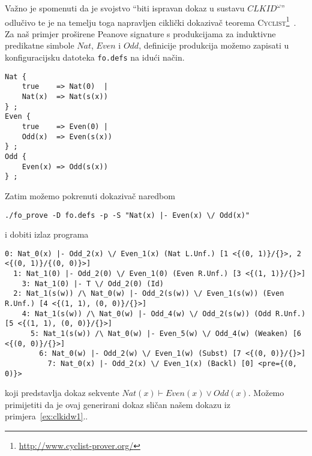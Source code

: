 Važno je spomenuti da je svojstvo \enquote{biti ispravan dokaz u sustavu \(\mathit{CLKID}^{\omega}\)} odlučivo
te je na temelju toga napravljen ciklički dokazivač teorema \textsc{Cyclist}\footnote{\url{http://www.cyclist-prover.org/}}~\cite{cyclist}.
Za naš primjer proširene Peanove signature s produkcijama za induktivne predikatne simbole
\(\mathit{Nat}\), \(\mathit{Even}\) i \(\mathit{Odd}\),
definicije produkcija možemo zapisati u konfiguracijsku datoteka \texttt{fo.defs}
na idući način.
\begin{verbatim}
Nat { 
    true    => Nat(0)  | 
    Nat(x)  => Nat(s(x)) 
} ;
Even {
    true    => Even(0) |
    Odd(x)  => Even(s(x))
} ;
Odd {
    Even(x) => Odd(s(x))
} ;
\end{verbatim}
Zatim možemo pokrenuti dokazivač naredbom
\begin{verbatim}
./fo_prove -D fo.defs -p -S "Nat(x) |- Even(x) \/ Odd(x)"
\end{verbatim}
i dobiti izlaz programa
\begin{scriptsize}
\begin{verbatim}
0: Nat_0(x) |- Odd_2(x) \/ Even_1(x) (Nat L.Unf.) [1 <{(0, 1)}/{}>, 2 <{(0, 1)}/{(0, 0)}>]
  1: Nat_1(0) |- Odd_2(0) \/ Even_1(0) (Even R.Unf.) [3 <{(1, 1)}/{}>]
    3: Nat_1(0) |- T \/ Odd_2(0) (Id)
  2: Nat_1(s(w)) /\ Nat_0(w) |- Odd_2(s(w)) \/ Even_1(s(w)) (Even R.Unf.) [4 <{(1, 1), (0, 0)}/{}>]
    4: Nat_1(s(w)) /\ Nat_0(w) |- Odd_4(w) \/ Odd_2(s(w)) (Odd R.Unf.) [5 <{(1, 1), (0, 0)}/{}>]
      5: Nat_1(s(w)) /\ Nat_0(w) |- Even_5(w) \/ Odd_4(w) (Weaken) [6 <{(0, 0)}/{}>]
        6: Nat_0(w) |- Odd_2(w) \/ Even_1(w) (Subst) [7 <{(0, 0)}/{}>]
          7: Nat_0(x) |- Odd_2(x) \/ Even_1(x) (Backl) [0] <pre={(0, 0)}>
\end{verbatim}
\end{scriptsize}
koji predstavlja dokaz sekvente \(\mathit{Nat}(x) \vdash \mathit{Even}(x) \lor \mathit{Odd}(x)\).
Možemo primijetiti da je ovaj generirani dokaz sličan našem dokazu iz primjera~\ref{ex:clkidw1}..

